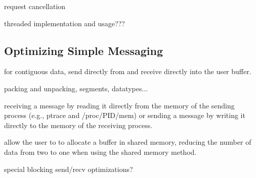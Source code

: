 request cancellation

threaded implementation and usage???


\subsection{Optimizing Simple Messaging}


for contiguous data, send directly from and receive directly into the
user buffer.

packing and unpacking, segments, datatypes...

receiving a message by reading it directly from the memory of the
sending process (e.g., ptrace and /proc/PID/mem) or sending a message
by writing it directly to the memory of the receiving process.

allow the user to  to allocate a buffer in shared
memory, reducing the number of data from two to one when using the
shared memory method.

special blocking send/recv optimizations?


